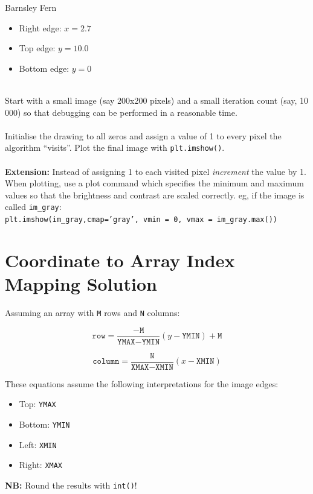 \documentclass{lab}
\begin{document}
\begin{task}{Barnsley Fern}{}
\begin{itemize}
\item Right edge: $x=2.7$
\item Top edge: $y=10.0$
\item Bottom edge: $y=0$
\end{itemize}
~\\
Start with a small image (say 200x200 pixels) and a small iteration count (say, 10 000) so that debugging can be performed in a reasonable time.
\\~\\
Initialise the drawing to all zeros and assign a value of 1 to every pixel the algorithm ``visits''. Plot the final image with \texttt{plt.imshow()}.
\\~\\
\textbf{Extension:} Instead of assigning 1 to each visited pixel \textit{increment} the value by 1. When plotting, use a plot command which specifies the minimum and maximum values so that the brightness and contrast are scaled correctly. eg, if the image is called \texttt{im\_gray}:\\ \texttt{plt.imshow(im\_gray,cmap='gray', vmin = 0, vmax = im\_gray.max())}
\end{task}

\section*{Coordinate to Array Index Mapping Solution}

Assuming an array with \texttt{M} rows and \texttt{N} columns:


\begin{equation}
\texttt{row} = \frac{-\texttt{M}}{\texttt{YMAX}-\texttt{YMIN}}(y-\texttt{YMIN}) + \texttt{M}
\end{equation}

\begin{equation}
\texttt{column} = \frac{\texttt{N}}{\texttt{XMAX}-\texttt{XMIN}}(x-\texttt{XMIN}) 
\end{equation}

These equations assume the following interpretations for the image edges:

\begin{itemize}
\item Top: \texttt{YMAX}
\item Bottom: \texttt{YMIN}
\item Left: \texttt{XMIN}
\item Right: \texttt{XMAX}
\end{itemize}

\textbf{NB:} Round the results with \texttt{int()}!
\end{document}
